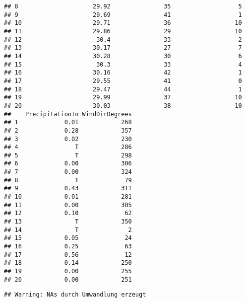 \documentclass[]{article}
\newenvironment{Shaded}{\begin{snugshade}}{\end{snugshade}}
\newcommand{\KeywordTok}[1]{\textcolor[rgb]{0.13,0.29,0.53}{\textbf{#1}}}
\newcommand{\CommentTok}[1]{\textcolor[rgb]{0.56,0.35,0.01}{\textit{#1}}}
\newcommand{\OperatorTok}[1]{\textcolor[rgb]{0.81,0.36,0.00}{\textbf{#1}}}
\newcommand{\NormalTok}[1]{#1}
\begin{document}
\begin{verbatim}
## 8                     29.92               35                   5
## 9                     29.69               41                   1
## 10                    29.71               36                  10
## 11                    29.86               29                  10
## 12                     30.4               33                   2
## 13                    30.17               27                   7
## 14                    30.28               30                   6
## 15                     30.3               33                   4
## 16                    30.16               42                   1
## 17                    29.55               41                   0
## 18                    29.47               44                   1
## 19                    29.99               37                  10
## 20                    30.03               38                  10
##    PrecipitationIn WindDirDegrees
## 1             0.01            268
## 2             0.28            357
## 3             0.02            230
## 4                T            286
## 5                T            298
## 6             0.00            306
## 7             0.00            324
## 8                T             79
## 9             0.43            311
## 10            0.01            281
## 11            0.00            305
## 12            0.10             62
## 13               T            350
## 14               T              2
## 15            0.05             24
## 16            0.25             63
## 17            0.56             12
## 18            0.14            250
## 19            0.00            255
## 20            0.00            251
\end{verbatim}

\begin{Shaded}
\end{Shaded}

\begin{verbatim}
## Warning: NAs durch Umwandlung erzeugt
\end{verbatim}
\end{document}
